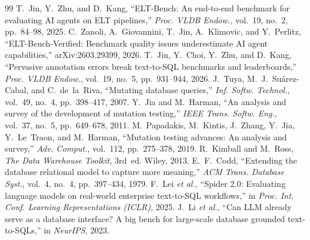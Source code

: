 \documentclass[10pt,conference]{IEEEtran}
\begin{document}
\begin{thebibliography}{99}
\footnotesize
{} T.~Jin, Y.~Zhu, and D.~Kang, ``ELT-Bench: An end-to-end benchmark for evaluating AI agents on ELT pipelines,'' \emph{Proc. VLDB Endow.}, vol.~19, no.~2, pp.~84--98, 2025.
 C.~Zanoli, A.~Giovannini, T.~Jin, A.~Klimovic, and Y.~Perlitz, ``ELT-Bench-Verified: Benchmark quality issues underestimate AI agent capabilities,'' arXiv:2603.29399, 2026.
 T.~Jin, Y.~Choi, Y.~Zhu, and D.~Kang, ``Pervasive annotation errors break text-to-SQL benchmarks and leaderboards,'' \emph{Proc. VLDB Endow.}, vol.~19, no.~5, pp.~931--944, 2026.
 J.~Tuya, M.~J.~Su\'arez-Cabal, and C.~de~la~Riva, ``Mutating database queries,'' \emph{Inf. Softw. Technol.}, vol.~49, no.~4, pp.~398--417, 2007.
 Y.~Jia and M.~Harman, ``An analysis and survey of the development of mutation testing,'' \emph{IEEE Trans. Softw. Eng.}, vol.~37, no.~5, pp.~649--678, 2011.
 M.~Papadakis, M.~Kintis, J.~Zhang, Y.~Jia, Y.~Le~Traon, and M.~Harman, ``Mutation testing advances: An analysis and survey,'' \emph{Adv. Comput.}, vol.~112, pp.~275--378, 2019.
 R.~Kimball and M.~Ross, \emph{The Data Warehouse Toolkit}, 3rd~ed. Wiley, 2013.
 E.~F.~Codd, ``Extending the database relational model to capture more meaning,'' \emph{ACM Trans. Database Syst.}, vol.~4, no.~4, pp.~397--434, 1979.
 F.~Lei \emph{et al.}, ``Spider 2.0: Evaluating language models on real-world enterprise text-to-SQL workflows,'' in \emph{Proc. Int. Conf. Learning Representations (ICLR)}, 2025.
 J.~Li \emph{et al.}, ``Can LLM already serve as a database interface? A big bench for large-scale database grounded text-to-SQLs,'' in \emph{NeurIPS}, 2023.
\end{thebibliography}
\end{document}
